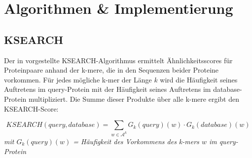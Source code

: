 \documentclass{article}
\begin{document}
\section{Algorithmen \& Implementierung}

\subsection{KSEARCH}
\label{ksearch}

Der in \cite{Holm} vorgestellte KSEARCH-Algorithmus ermittelt Ähnlichkeitsscores für Proteinpaare anhand der k-mere, die in den Sequenzen beider Proteine vorkommen. Für jedes mögliche k-mer der Länge $k$ wird die Häufigkeit seines Auftretens im query-Protein mit der Häufigkeit seines Auftretens im database-Protein multipliziert. Die Summe dieser Produkte über alle k-mere ergibt den KSEARCH-Score:

\begin{equation*}
KSEARCH(query,database) = \sum_{w \in \mathcal A^k} G_k(query)(w) \cdot G_k(database)(w)
\end{equation*}  
\textit{mit $G_k(query)(w)$ = Häufigkeit des Vorkommens des k-mers $w$ im query-Protein}\\ \\
\end{document}
